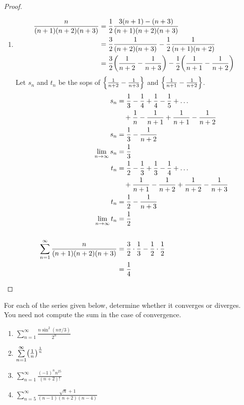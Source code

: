 \documentclass[12pt]{article}
\begin{document}
\begin{proof}
\begin{enumerate}[label=(\alph*)]
        \item
        \begin{align*}
            \frac{n}{(n + 1)(n + 2)(n + 3)} &= \frac{1}{2}\frac{3(n + 1) - (n + 3)}{(n + 1)(n + 2)(n + 3)} \\
            &= \frac{3}{2} \frac{1}{(n + 2)(n + 3)} - \frac{1}{2} \frac{1}{(n + 1)(n + 2)}\\
            &= \frac{3}{2} \paren{\frac{1}{n + 2} - \frac{1}{n + 3}} - \frac{1}{2} \paren{\frac{1}{n + 1} - \frac{1}{n + 2}}
        \end{align*}
        Let $s_{n}$ and $t_{n}$ be the sops of $\set{\frac{1}{n+2} - \frac{1}{n+3}}$ and $\set{\frac{1}{n+1} - \frac{1}{n+2}}$.
        \begin{align*}
            s_{n} &= \frac{1}{3} - \frac{1}{4} + \frac{1}{4} - \frac{1}{5} + \dots \\
                  &\quad+ \frac{1}{n} - \frac{1}{n+1} + \frac{1}{n+1} - \frac{1}{n+2} \\
            s_{n} &= \frac{1}{3} - \frac{1}{n+2} \\
            \lim_{n \to \infty} s_{n} &= \frac{1}{3} \\
            t_{n} &= \frac{1}{2} - \frac{1}{3} + \frac{1}{3} -\frac{1}{4} + \dots \\
                  &\quad+ \frac{1}{n + 1} - \frac{1}{n + 2} + \frac{1}{n + 2} - \frac{1}{n + 3}\\
            t_{n} &= \frac{1}{2} - \frac{1}{n + 3} \\
            \lim_{n \to \infty} t_{n} &= \frac{1}{2} \\
            \\
            \sum_{n=1}^{\infty} \frac{n}{(n + 1)(n + 2)(n + 3)} &= \frac{3}{2} \cdot \frac{1}{3} - \frac{1}{2} \cdot \frac{1}{2} \\
            &= \frac{1}{4} \qedhere
        \end{align*}
    \end{enumerate}
\end{proof}

\begin{problem}
    For each of the series given below, determine whether it converges or diverges.
    You need not compute the sum in the case of convergence.
    \begin{enumerate}[label=(\arabic*)]
        \item $\sum\limits_{n=1}^{\infty} \frac{n \sin^{2}(n\pi/3)}{2^{n}}$
        \item $\sum\limits_{n=1}^{\infty} \paren{\frac{1}{n}}^{\frac{1}{n}}$
        \item $\sum\limits_{n=1}^{\infty} \frac{(-1)^{n}n^{25}}{(n+2)!}$
        \item $\sum\limits_{n=5}^{\infty} \frac{\sqrt{n}+1}{(n-1)(n+2)(n-4)}$
    \end{enumerate}
\end{problem}
\end{document}
